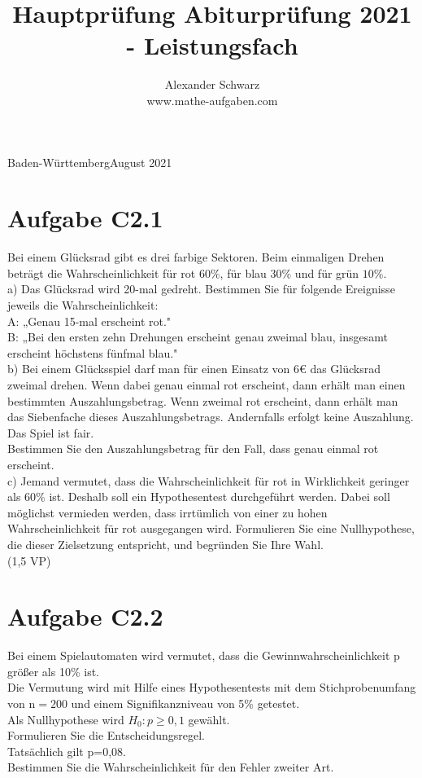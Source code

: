 \documentclass[10pt]{article}
\title{Hauptprüfung Abiturprüfung 2021 - Leistungsfach }
\author{Alexander Schwarz\\
www.mathe-aufgaben.com}
\date{}
\begin{document}
\maketitle
 Baden-WürttembergAugust 2021

\section*{Aufgabe C2.1}
Bei einem Glücksrad gibt es drei farbige Sektoren. Beim einmaligen Drehen beträgt die Wahrscheinlichkeit für rot $60 \%$, für blau $30 \%$ und für grün $10 \%$.\\
a) Das Glücksrad wird 20-mal gedreht. Bestimmen Sie für folgende Ereignisse jeweils die Wahrscheinlichkeit:\\
A: „Genau 15-mal erscheint rot."\\
B: „Bei den ersten zehn Drehungen erscheint genau zweimal blau, insgesamt erscheint höchstens fünfmal blau."\\
b) Bei einem Glücksspiel darf man für einen Einsatz von $6 €$ das Glücksrad zweimal drehen. Wenn dabei genau einmal rot erscheint, dann erhält man einen bestimmten Auszahlungsbetrag. Wenn zweimal rot erscheint, dann erhält man das Siebenfache dieses Auszahlungsbetrags. Andernfalls erfolgt keine Auszahlung. Das Spiel ist fair.\\
Bestimmen Sie den Auszahlungsbetrag für den Fall, dass genau einmal rot erscheint.\\
c) Jemand vermutet, dass die Wahrscheinlichkeit für rot in Wirklichkeit geringer als $60 \%$ ist. Deshalb soll ein Hypothesentest durchgeführt werden. Dabei soll möglichst vermieden werden, dass irrtümlich von einer zu hohen Wahrscheinlichkeit für rot ausgegangen wird. Formulieren Sie eine Nullhypothese, die dieser Zielsetzung entspricht, und begründen Sie Ihre Wahl.\\
(1,5 VP)

\section*{Aufgabe C2.2}
Bei einem Spielautomaten wird vermutet, dass die Gewinnwahrscheinlichkeit p größer als 10\% ist.\\
Die Vermutung wird mit Hilfe eines Hypothesentests mit dem Stichprobenumfang von $\mathrm{n}=200$ und einem Signifikanzniveau von 5\% getestet.\\
Als Nullhypothese wird $H_{0}: p \geq 0,1$ gewählt.\\
Formulieren Sie die Entscheidungsregel.\\
Tatsächlich gilt p=0,08.\\
Bestimmen Sie die Wahrscheinlichkeit für den Fehler zweiter Art.
\end{document}
